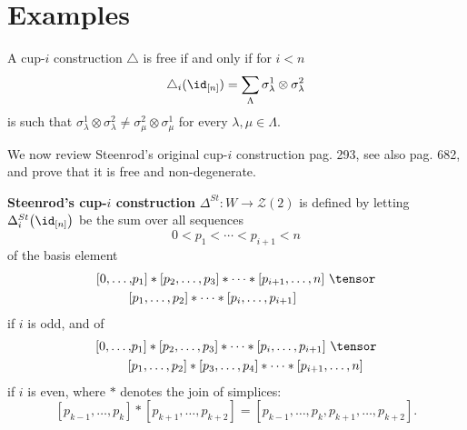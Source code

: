 
\section{Examples}

\begin{lemma} \label{lemma: free and non-deg in coproduct}
	A cup-$i$ construction $\triangle$ is free if and only if for $i < n$
	\[
	\triangle_i (\id_{[n]}) = \sum_{\Lambda} \sigma^1_\lambda \otimes \sigma^2_\lambda
	\]
	is such that $\sigma^1_\lambda \otimes \sigma^2_\lambda \neq \sigma^2_\mu \otimes \sigma^1_\mu$ for every $\lambda, \mu \in \Lambda$.
\end{lemma}

We now review Steenrod's original cup-$i$ construction \cite{steenrod1947products} pag.  293, see also \cite{mcclure2003multivariable} pag. 682, and prove that it is free and non-degenerate.

\begin{definition}
	\textbf{Steenrod's cup-$i$ construction} $\Delta^{St} : W \to \mathcal{Z}(2)$ is defined by letting $\Delta_i^{St} \big( \id_{[n]} \big)$ be the sum over all sequences
	\[
	0 < p_1 < \cdots < p_{i+1} < n
	\]
	of the basis element
	\begin{equation} \label{equation: steenrod original i odd}
	\begin{split}
	[ 0, \dots, &{p_1} ] \ast [ {p_2}, \dots, {p_3} ] \ast \cdots \ast [ {p_{i+1}}, \dots, n ]\ \tensor \\
	[ &{p_1}, \dots, {p_2} ] \ast \cdots \ast [ {p_{i}}, \dots, {p_{i+1}} ]
	\end{split}
	\end{equation}
	if $i$ is odd, and of
	\begin{equation} \label{equation: steenrod original i even}
	\begin{split}
	[ 0, \dots, &{p_1} ] \ast [ {p_2}, \dots, {p_3} ] \ast \cdots \ast [ {p_{i}}, \dots, {p_{i+1}} ]\ \tensor \\
	[ &{p_1}, \dots, {p_2} ] \ast [ {p_3}, \dots, {p_4} ] \ast \cdots \ast [ {p_{i+1}}, \dots, n ]
	\end{split}
	\end{equation}
	if $i$ is even, where $\ast$ denotes the join of simplices:
	\[
	[{p_{k-1}}, \dots, {p_{k}} ] \ast [ {p_{k+1}}, \dots, p_{k+2}] = [{p_{k-1}}, \dots, p_k, p_{k+1}, \dots, p_{k+2}].
	\]
\end{definition}

